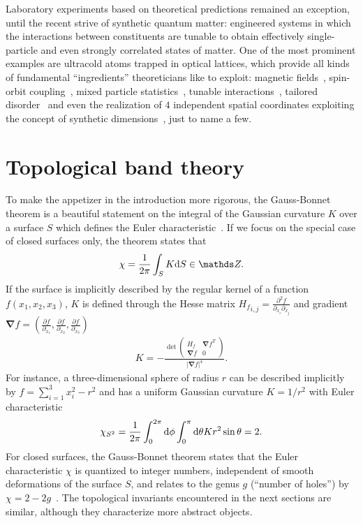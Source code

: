 Laboratory experiments based on theoretical predictions remained an exception, until the recent strive of synthetic quantum matter:
engineered systems in which the interactions between constituents are tunable to obtain effectively single-particle and even strongly correlated states of matter.
One of the most prominent examples are ultracold atoms trapped in optical lattices, which provide all kinds of fundamental ``ingredients'' theoreticians like to exploit: magnetic fields~\cite{Lin2009}, spin-orbit coupling~\cite{Lin2011}, mixed particle statistics~\cite{Ferrari2002}, tunable interactions~\cite{Chin2010}, tailored disorder~\cite{Meier2018} and even the realization of $4$ independent spatial coordinates exploiting the concept of synthetic dimensions~\cite{Lohse2018}, just to name a few.
%
%
\section{Topological band theory}
\label{sec:topological_band_theory}
%
%
To make the appetizer in the introduction more rigorous, the Gauss-Bonnet theorem is a beautiful statement on the integral of the Gaussian curvature $K$ over a surface $S$ which defines the Euler characteristic~\cite{Nakahara1990}.
If we focus on the special case of closed surfaces only, the theorem states that
\begin{align}
    \chi = \frac1{2\pi}\int_S K\rd S\in\mathds Z.
    \label{eq:gauss_bonnet_theorem}
\end{align}
If the surface is implicitly described by the regular kernel of a function $f(x_1,x_2,x_3)$, $K$ is defined through the Hesse matrix ${H_f}_{i,j}=\frac{\partial^2 f}{\partial_{x_i}\partial_{x_j}}$ and gradient $\bm\nabla f = (\frac{\partial f}{\partial_{x_1}},\frac{\partial f}{\partial_{x_2}},\frac{\partial f}{\partial_{x_3}})$~\cite{Goldman2005}
\begin{align}
    K = -\frac{
    \det
    \begin{pmatrix}
        H_f & \bm\nabla f^T \\
        \bm\nabla f & 0
    \end{pmatrix}
    }{|\bm\nabla f|^4}
    .
\end{align}
For instance, a three-dimensional sphere of radius $r$ can be described implicitly by $f=\sum_{i=1}^3 x_i^2 - r^2$ and has a uniform Gaussian curvature $K=1/r^2$ with Euler characteristic
\begin{align}
    \chi_{S^2} = \frac1{2\pi}\int_0^{2\pi}\mathrm d\phi \int_0^\pi\mathrm d\theta K r^2\sin\theta = 2.
\end{align}
For closed surfaces, the Gauss-Bonnet theorem states that the Euler characteristic $\chi$ is quantized to integer numbers, independent of smooth deformations of the surface $S$, and relates to the genus $g$ (``number of holes'') by $\chi=2-2g$~\cite{Nakahara1990}.
The topological invariants encountered in the next sections are similar, although they characterize more abstract objects.

